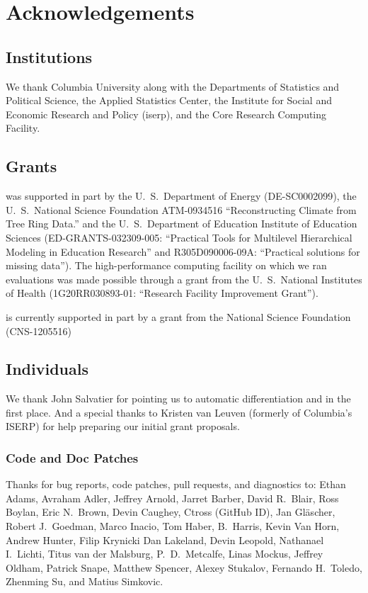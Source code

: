 \chapter*{Acknowledgements}

\section*{Institutions}

We thank Columbia University along with the Departments of
Statistics and Political Science, the Applied Statistics Center, the
Institute for Social and Economic Research and Policy ({\sc iserp}),
and the Core Research Computing Facility.

\section*{Grants}

\Stan was supported in part by 
%
the U.~S.\ Department of Energy 
({\small DE-SC0002099}), 
%
the U.~S.\ National Science Foundation 
{\small ATM-0934516}
``Reconstructing Climate from Tree Ring Data.''
and 
%
the U.~S.\ Department of Education Institute of Education Sciences 
({\small ED-GRANTS-032309-005}:
 ``Practical Tools for Multilevel Hierarchical Modeling in Education
 Research'' and
 {\small R305D090006-09A}:
 ``Practical solutions for missing data'').
%
The high-performance computing
facility on which we ran evaluations was made possible through 
a grant from the U.~S.\ National Institutes of Health 
({\small 1G20RR030893-01}:
 ``Research Facility Improvement Grant'').

\Stan is currently supported in part by a grant from the National
Science Foundation (CNS-1205516)

\section*{Individuals}

We thank John Salvatier for pointing us to automatic differentiation
and \HMC in the first place.  And a special thanks to Kristen van
Leuven (formerly of Columbia's ISERP) for help preparing our initial
grant proposals.

\subsection*{Code  and Doc Patches}

Thanks for bug reports, code patches, pull requests, and diagnostics
to: 
Ethan Adams, 
Avraham Adler,
Jeffrey Arnold, 
Jarret Barber, 
David R.~Blair, 
Ross Boylan, 
Eric N.~Brown, 
Devin Caughey, 
Ctross (GitHub ID), 
Jan Gl\"ascher,
Robert J.\ Goedman, 
Marco Inacio, 
Tom Haber,
B.~Harris, 
Kevin Van Horn, 
Andrew Hunter, 
Filip Krynicki
Dan Lakeland, 
Devin Leopold, 
Nathanael I.~Lichti,
Titus van der Malsburg,
P.~D.~Metcalfe, 
Linas Mockus,
Jeffrey Oldham, 
Patrick Snape,
Matthew Spencer,
Alexey Stukalov,
Fernando H.~Toledo, 
Zhenming Su,
and Matius Simkovic.


